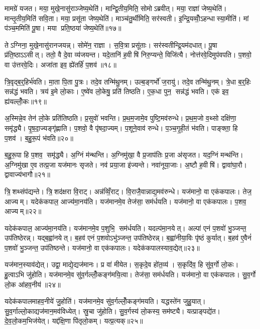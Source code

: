 मामग्रे॑ यजत। मया॒ मुखे॒नासु॑राञ्जेष्य॒थेति॑। मान्द्वि॒तीय॒मिति॒ सोमोऽब्रवीत्। मया॒ राज्ञा॑ जेष्य॒थेति॑। मान्तृ॒तीय॒मिति॑ सवि॒ता। मया॒ प्रसू॑ता जेष्य॒थेति॑। माञ्च॑तु॒र्थीमिति॒ सर॑स्वती। इ॒न्द्रि॒यव्वोँ॒ऽहन्धास्या॒मीति॑। मां प॑ञ्च॒ममिति॑ पू॒षा। मया प्रति॒ष्ठया॑ जेष्य॒थेति॑॥१७॥

तेऽग्निना॒ मुखे॒नासु॑रानजयन्न्। सोमे॑न॒ राज्ञा। स॒वि॒त्रा प्रसू॑ताः। सर॑स्वतीन्द्रि॒यम॑दधात्। पू॒षा प्र॑ति॒ष्ठाऽऽसीत्। ततो॒ वै दे॒वा व्य॑जयन्त। यदे॒तानि॑ ह॒वीषि॑ निरु॒प्यन्ते॒ विजि॑त्यै। नोत्त॑रवे॒दिमुप॑वपति। प॒शवो॒ वा उ॑त्तरवे॒दिः। अजा॑ता इव॒ ह्ये॑तर्\mbox{}हि॑ प॒शव॑॥१८॥\anuvakamend[ऐ॒दित्य॑शोचद्व्यु॒द्धर॑त्यब्रवीत्प्रति॒ष्ठया॑ जेष्य॒थेत्ये॒तर्\mbox{}हि॑ प॒शव॑]

त्रि॒वृद्ब॒र्॒हिर्भ॑वति। मा॒ता पि॒ता पु॒त्रः। तदे॒व तन्मि॑थु॒नम्। उल्ब॒ङ्गर्भो॑ ज॒रायु॑। तदे॒व तन्मि॑थु॒नम्। त्रे॒धा ब॒र्॒हिः सन्न॑द्धं भवति। त्रय॑ इ॒मे लो॒काः। ए॒ष्वे॑व लो॒केषु॒ प्रति॑ तिष्ठति। ए॒क॒धा पुन॒ सन्न॑द्धं भवति। एक॑ इव॒ ह्य॑यल्लोँ॒कः॥१९॥

अ॒स्मिन्ने॒व तेन॑ लो॒के प्रति॑तिष्ठति। प्र॒सुवो॑ भवन्ति। प्र॒थ॒म॒जामे॒व पुष्टि॒मव॑रुन्धे। प्र॒थ॒म॒जो व॒थ्सो दक्षि॑णा॒ समृ॑द्ध्यै। पृ॒ष॒दा॒ज्यङ्गृ॑ह्णाति। प॒शवो॒ वै पृ॑षदा॒ज्यम्। प॒शूने॒वाव॑ रुन्धे। प॒ञ्च॒गृ॒ही॒तं भ॑वति। पाङ्क्ता॒ हि प॒शव॑। ब॒हु॒रू॒पं भ॑वति॥२०॥

ब॒हु॒रू॒पा हि प॒शव॒ समृ॑द्ध्यै। अ॒ग्निं म॑न्थन्ति। अ॒ग्निमु॑खा॒ वै प्र॒जाप॑तिः प्र॒जा अ॑सृजत। यद॒ग्निं मन्थ॑न्ति। अ॒ग्निमु॑खा ए॒व तत्प्र॒जा यज॑मानः सृजते। नव॑ प्रया॒जा इ॑ज्यन्ते। नवा॑नूया॒जाः। अ॒ष्टौ ह॒वीषि॑। द्वावा॑घा॒रौ। द्वावाज्य॑भागौ॥२१॥

त्रि॒शथ्संप॑द्यन्ते। त्रि॒शद॑क्षरा वि॒राट्। अन्न॑व्विँ॒राट्। वि॒राजै॒वान्नाद्य॒मव॑रुन्धे। यज॑मानो॒ वा एक॑कपालः। तेज॒ आज्यम्। यदेक॑कपाल॒ आज्य॑मा॒नय॑ति। यज॑मानमे॒व तेज॑सा॒ सम॑र्धयति। यज॑मानो॒ वा एक॑कपालः। प॒शव॒ आज्यम्॥२२॥

यदेक॑कपाल॒ आज्य॑मा॒नय॑ति। यज॑मानमे॒व प॒शुभि॒ सम॑र्धयति। यदल्प॑मा॒नयेत्। अल्पा॑ एनं प॒शवो॑ भु॒ञ्जन्त॒ उप॑तिष्ठेरन्न्। यद्ब॒ह्वा॑नयेत्। ब॒हव॑ एनं प॒शवोऽभु॑ञ्जन्त॒ उप॑तिष्ठेरन्न्। ब॒ह्वा॑नीया॒विः पृ॑ष्ठं कुर्यात्। ब॒हव॑ ए॒वैनं॑ प॒शवो॑ भु॒ञ्जन्त॒ उप॑तिष्ठन्ते। यज॑मानो॒ वा एक॑कपालः। यदेक॑कपालस्याव॒द्येत्॥२३॥

यज॑मान॒स्याव॑द्येत्। उद्वा॒ माद्ये॒द्यज॑मानः। प्र वा॑ मीयेत। स॒कृदे॒व हो॑त॒व्य॑। स॒कृदि॑व॒ हि सु॑व॒र्गो लो॒कः। हु॒त्वाऽभि जु॑होति। यज॑मानमे॒व सु॑व॒र्गल्लोँ॒कङ्ग॑मयि॒त्वा। तेज॑सा॒ सम॑र्धयति। यज॑मानो॒ वा एक॑कपालः। सु॒व॒र्गो लो॒क आ॑हव॒नीय॑॥२४॥

यदेक॑कपालमाहव॒नीये॑ जु॒होति॑। यज॑मानमे॒व सु॑व॒र्गल्लोँ॒कङ्ग॑मयति। यद्धस्ते॑न जुहु॒यात्। सु॒व॒र्गाल्लो॒काद्यज॑मान॒मव॑विध्येत्। स्रु॒चा जु॑होति। सु॒व॒र्गस्य॑ लो॒कस्य॒ सम॑ष्ट्यै। यत्प्राङ्पद्ये॑त। दे॒व॒लो॒कम॒भिज॑येत्। यद्द॑क्षि॒णा पि॑तृलो॒कम्। यत्प्र॒त्यक्॥२५॥

